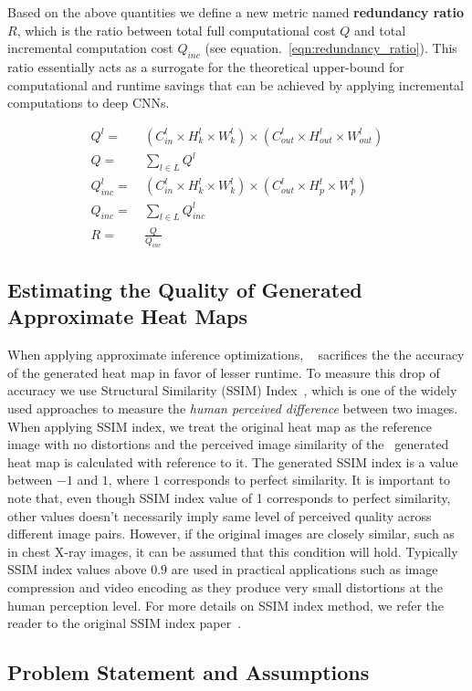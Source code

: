 Based on the above quantities we define a new metric named \textbf{redundancy ratio} $R$, which is the ratio between total full computational cost $Q$ and total incremental computation cost $Q_{inc}$ (see equation.~\ref{eqn:redundancy_ratio}). This ratio essentially acts as a surrogate for the theoretical upper-bound for computational and runtime savings that can be achieved by applying incremental computations to deep CNNs.

\begin{align}
\label{eqn:full_local}
Q^l =&~ (C^l_{in} \times H^l_{k} \times W^l_{k}) \times (C^l_{out} \times H^l_{out} \times W^l_{out})\\
\label{eqn:full_all}
Q =&~ \sum_{l \in L} Q^l\\
\label{eqn:inc_local}
Q_{inc}^l =&~ (C^l_{in} \times H^l_{k} \times W^l_{k}) \times (C^l_{out} \times H^l_{p} \times W^l_{p})\\
\label{eqn:inc_all}
Q_{inc} =&~ \sum_{l \in L} Q^l_{inc}\\
\label{eqn:redundancy_ratio}
R =&~ \frac{Q}{Q_{inc}}
\end{align}

\subsection{Estimating the Quality of Generated Approximate Heat Maps}

When applying approximate inference optimizations, \system~ sacrifices the the accuracy of the generated heat map in favor of lesser runtime.
To measure this drop of accuracy we use Structural Similarity (SSIM) Index~\cite{wang2004image}, which is one of the widely used approaches to measure the \textit{human perceived difference} between two images.
When applying SSIM index, we treat the original heat map as the reference image with no distortions and the perceived image similarity of the \system~generated heat map is calculated with reference to it.
The generated SSIM index is a value between $-1$ and $1$, where $1$ corresponds to perfect similarity.
It is important to note that, even though SSIM index value of 1 corresponds to perfect similarity, other values doesn't necessarily imply same level of perceived quality across different image pairs.
However, if the original images are closely similar, such as in chest X-ray images, it can be assumed that this condition will hold.
Typically SSIM index values above $0.9$ are used in practical applications such as image compression and video encoding as they produce very small distortions at the human perception level.
For more details on SSIM index method, we refer the reader to the original SSIM index paper~\cite{wang2004image}.


\subsection{Problem Statement and Assumptions}